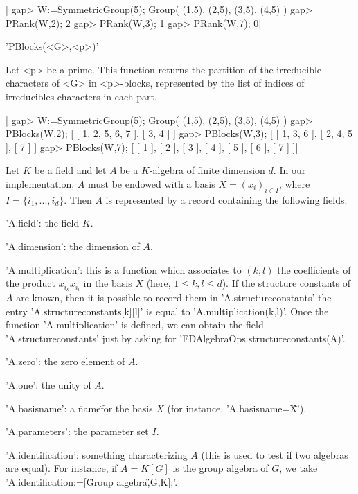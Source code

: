 |    gap> W:=SymmetricGroup(5);
    Group( (1,5), (2,5), (3,5), (4,5) )
    gap> PRank(W,2);
    2
    gap> PRank(W,3);
    1
    gap> PRank(W,7);
    0|

'PBlocks(<G>,<p>)'

Let  <p> be a prime. This function returns the partition of the irreducible
characters of <G> in <p>-blocks, represented by the list of indices of
irreducibles characters in each part.

|    gap> W:=SymmetricGroup(5);
    Group( (1,5), (2,5), (3,5), (4,5) )
    gap> PBlocks(W,2);
    [ [ 1, 2, 5, 6, 7 ], [ 3, 4 ] ]
    gap> PBlocks(W,3);
    [ [ 1, 3, 6 ], [ 2, 4, 5 ], [ 7 ] ]
    gap> PBlocks(W,7);
    [ [ 1 ], [ 2 ], [ 3 ], [ 4 ], [ 5 ], [ 6 ], [ 7 ] ]|


Let $K$ be a field and let $A$ be a $K$-algebra of finite dimension $d$. In
our implementation, $A$ must be endowed with a basis $X = (x_i)_{i \in I}$,
where  $I=\{i_1,...,i_d\}$. Then $A$ is  represented by a record containing
the following fields:

'A.field': the field $K$.

'A.dimension': the dimension of $A$.

'A.multiplication':  this  is  a  function  which associates to $(k,l)$ the
coefficients  of the product  $x_{i_k} x_{i_l}$ in  the basis $X$ (here, $1
\le  k, l \le d$). If the structure  constants of $A$ are known, then it is
possible   to   record   them   in   'A.structureconstants'\:   the   entry
'A.structureconstants[k][l]'  is equal to 'A.multiplication(k,l)'. Once the
function   'A.multiplication'  is   defined,  we   can  obtain   the  field
'A.structureconstants' just by asking for
'FDAlgebraOps.structureconstants(A)'.

'A.zero': the zero element of $A$.

'A.one': the unity of $A$.

'A.basisname': a \"name\" for the basis $X$ (for instance,
'A.basisname\:=\"X\"').

'A.parameters': the parameter set $I$.

'A.identification':  something characterizing $A$ (this  is used to test if
two  algebras are equal). For instance, if $A=K[G]$ is the group algebra of
$G$, we take 'A.identification:=[\"Group algebra\",G,K];'.

